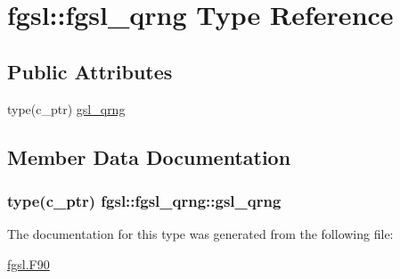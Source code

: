 \hypertarget{structfgsl_1_1fgsl__qrng}{\section{fgsl\-:\-:fgsl\-\_\-qrng Type Reference}
\label{structfgsl_1_1fgsl__qrng}
}
\subsection*{Public Attributes}
\begin{DoxyCompactItemize}
\item 
type(c\-\_\-ptr) \hyperlink{structfgsl_1_1fgsl__qrng_a6d51d043c87751f28f580741aca6be6c}{gsl\-\_\-qrng}
\end{DoxyCompactItemize}


\subsection{Member Data Documentation}
\hypertarget{structfgsl_1_1fgsl__qrng_a6d51d043c87751f28f580741aca6be6c}{
\subsubsection[{gsl\-\_\-qrng}]{\setlength{\rightskip}{0pt plus 5cm}type(c\-\_\-ptr) fgsl\-::fgsl\-\_\-qrng\-::gsl\-\_\-qrng}}\label{structfgsl_1_1fgsl__qrng_a6d51d043c87751f28f580741aca6be6c}


The documentation for this type was generated from the following file\-:\begin{DoxyCompactItemize}
\item 
\hyperlink{fgsl_8F90}{fgsl.\-F90}\end{DoxyCompactItemize}
